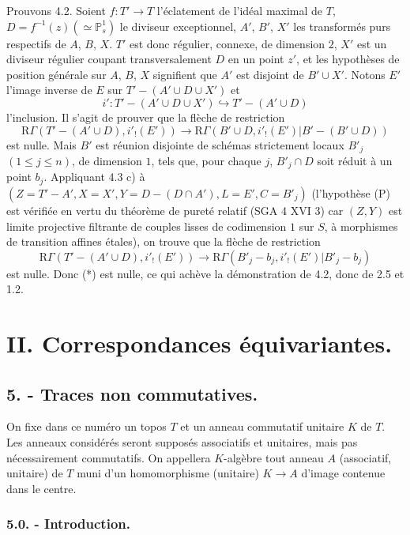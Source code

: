Prouvons 4.2. Soient $f:T'\to T$ l'éclatement de l'idéal
maximal de $T$, $D=f^{-1}(z)(\simeq\mathbb{P}^1_s)$ le diviseur exceptionnel, $A'$, $B'$, $X'$ les transformés purs respectifs de $A$, $B$, $X$. $T'$ est donc régulier, connexe, de dimension $2$, $X'$ est un diviseur régulier coupant transversalement $D$ en un point $z'$, et les hypothèses de position générale sur $A$, $B$, $X$ signifient que $A'$ est disjoint de 
$B'\cup X'$. Notons $E'$ l'image inverse de $E$ sur $T'-(A'\cup D\cup X')$ et
\[
i':T'-(A'\cup D\cup X')\hookrightarrow T'-(A'\cup D)
\]
l'inclusion. Il s'agit de prouver que la flèche de restriction
\begin{equation}
\mathrm{R}\Gamma(T'-(A'\cup D),i'_!(E'))
\longrightarrow
\mathrm{R}\Gamma(B'\cup D,i'_!(E')|B'-(B'\cup D))
\tag{*}
\end{equation}
est nulle. Mais $B'$ est réunion disjointe de schémas strictement locaux $B'_j$ $(1\le j\le n)$, de dimension $1$, tels que, pour chaque $j$, $B'_j\cap D$ soit réduit à un point $b_j$. Appliquant 4.3 c) à $(Z=T'-A', X=X', Y=D-(D\cap A'), L=E', C=B'_j)$ (l'hypothèse (P) est vérifiée en vertu du théorème de pureté relatif (SGA 4 XVI 3) car $(Z,Y)$ est limite projective filtrante de couples lisses de codimension $1$ sur $S$, à morphismes de transition affines étales), on trouve que la flèche de restriction
\[
\mathrm{R}\Gamma(T'-(A'\cup D),i'_!(E'))
\longrightarrow
\mathrm{R}\Gamma(B'_j-b_j,i'_!(E')|B'_j-b_j)
\]
est nulle. Donc (*) est nulle, ce qui achève la démonstration de 4.2, donc de 2.5 et 1.2.

\section*{II. Correspondances équivariantes.}

\subsection*{5. - Traces non commutatives.}

On fixe dans ce numéro un topos $T$ et un anneau commutatif unitaire $K$ de $T$. Les anneaux considérés seront supposés associatifs et unitaires, mais pas nécessairement commutatifs. On appellera $K$-algèbre tout anneau $A$ (associatif, unitaire) de $T$ muni d'un homomorphisme (unitaire) $K\to A$ d'image contenue dans le centre.

\subsubsection*{5.0. - Introduction.}

